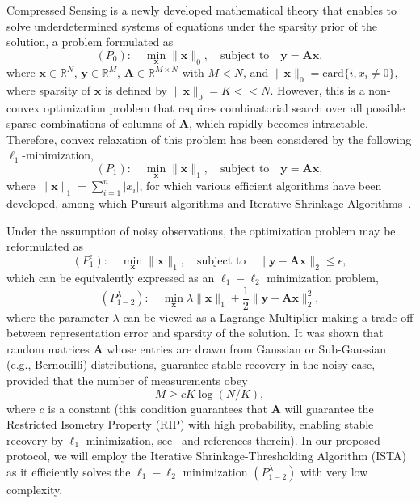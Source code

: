 \documentclass[letterpaper,conference]{IEEEtran}
\begin{document}
Compressed Sensing is a newly developed mathematical theory that enables to solve underdetermined systems of equations under the sparsity prior of the solution, a problem formulated as
\begin{equation}\label{eq P0}
(P_{0}): \quad \min_{\mathbf{x}} \|\mathbf{x}\|_0, \quad \text{subject to} \quad \mathbf{y}=\mathbf{A}\mathbf{x},
\end{equation}
where $\mathbf{x} \in \mathbb{R}^N$, $\mathbf{y} \in \mathbb{R}^M$, $\mathbf{A} \in \mathbb{R}^{M\times N}$ with $M<N$, and $\|\mathbf{x}\|_0=\text{card}\{i, x_i \neq 0\}$, where sparsity of $\mathbf{x}$ is defined by $\|\mathbf{x}\|_0=K << N$.
However, this is a non-convex optimization problem that requires combinatorial search over all possible sparse combinations of columns of $\mathbf{A}$, which rapidly becomes intractable. Therefore, convex relaxation of this problem has been considered by the following $\ell_1$-minimization,
\begin{equation}\label{eq P1}
(P_{1}): \quad \min_{\mathbf{x}} \|\mathbf{x}\|_1, \quad \text{subject to} \quad \mathbf{y}=\mathbf{A}\mathbf{x},
\end{equation}
where $\|\mathbf{x}\|_1=\sum_{i=1}^n|x_i|$, for which various efficient algorithms have been developed, among which Pursuit algorithms and Iterative Shrinkage Algorithms~\cite{Elad10}.

Under the assumption of noisy observations, the optimization problem may be reformulated as
\begin{equation}\label{eq P1e}
(P_{1}^{\epsilon}): \quad \min_{\mathbf{x}} \|\mathbf{x}\|_1, \quad \text{subject to} \quad \|\mathbf{y}-\mathbf{A}\mathbf{x}\|_2 \leq \epsilon,
\end{equation}
which can be equivalently expressed as an $\ell_1-\ell_2$ minimization problem,
\begin{equation}\label{eq P12}
(P_{1-2}^{\lambda}): \quad \min_{\mathbf{x}} \lambda\|\mathbf{x}\|_1 + \frac{1}{2}\|\mathbf{y}-\mathbf{A}\mathbf{x}\|_2^2,
\end{equation}
where the parameter $\lambda$ can be viewed as a Lagrange Multiplier making a trade-off between representation error and sparsity of the solution.
It was shown that random matrices $\mathbf{A}$ whose entries are drawn from Gaussian or Sub-Gaussian (e.g., Bernouilli) distributions, guarantee stable recovery in the noisy case, provided that the number of measurements obey
\begin{equation}
    M \geq cK\log(N/K),
\end{equation}
where $c$ is a constant (this condition guarantees that $\mathbf{A}$ will guarantee the Restricted Isometry Property (RIP) with high probability, enabling stable recovery by $\ell_1$-minimization, see~\cite{Elad10} and references therein).
In our proposed protocol, we will employ the Iterative Shrinkage-Thresholding Algorithm (ISTA)~\cite{Dau04nov} as it efficiently solves the
$\ell_1-\ell_2$ minimization $(P_{1-2}^{\lambda})$ with very low complexity.
\end{document}

